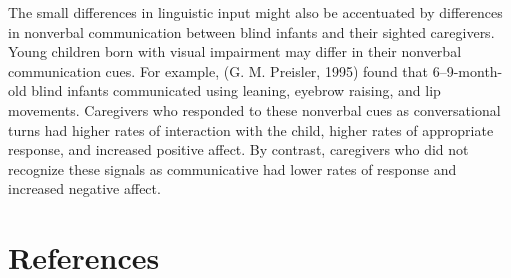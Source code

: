 \documentclass[
  man,floatsintext]{apa6}
\begin{document}
The small differences in linguistic input might also be accentuated by differences in nonverbal communication between blind infants and their sighted caregivers. Young children born with visual impairment may differ in their nonverbal communication cues. For example, (G. M. Preisler, 1995) found that 6--9-month-old blind infants communicated using leaning, eyebrow raising, and lip movements. Caregivers who responded to these nonverbal cues as conversational turns had higher rates of interaction with the child, higher rates of appropriate response, and increased positive affect. By contrast, caregivers who did not recognize these signals as communicative had lower rates of response and increased negative affect.

\pagebreak

\hypertarget{references}{%
\section*{References}\label{references}}
\end{document}
